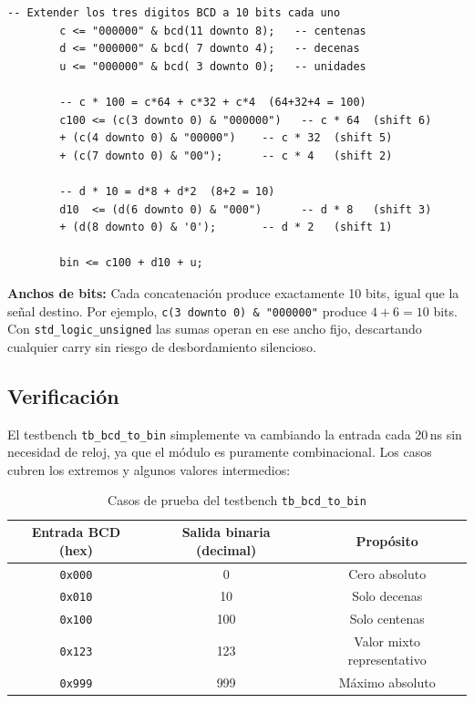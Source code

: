 \documentclass[memoria_final]{subfiles}
\begin{document}
	\begin{lstlisting}[caption={Núcleo de \texttt{bcd\_to\_bin.vhd} --- multiplicación por desplazamientos}]
		-- Extender los tres digitos BCD a 10 bits cada uno
		c <= "000000" & bcd(11 downto 8);   -- centenas
		d <= "000000" & bcd( 7 downto 4);   -- decenas
		u <= "000000" & bcd( 3 downto 0);   -- unidades
		
		-- c * 100 = c*64 + c*32 + c*4  (64+32+4 = 100)
		c100 <= (c(3 downto 0) & "000000")   -- c * 64  (shift 6)
		+ (c(4 downto 0) & "00000")    -- c * 32  (shift 5)
		+ (c(7 downto 0) & "00");      -- c * 4   (shift 2)
		
		-- d * 10 = d*8 + d*2  (8+2 = 10)
		d10  <= (d(6 downto 0) & "000")      -- d * 8   (shift 3)
		+ (d(8 downto 0) & '0');       -- d * 2   (shift 1)
		
		bin <= c100 + d10 + u;
	\end{lstlisting}
	
	\begin{tcolorbox}[colback=SoftOrange, colframe=MainOrange, boxrule=0.8pt, arc=2pt,
		left=0.5cm, right=0.5cm, top=0.3cm, bottom=0.3cm]
		\small\faExclamationTriangle\enspace\textbf{Anchos de bits:} Cada
		concatenación produce exactamente 10 bits, igual que la señal destino.
		Por ejemplo, \texttt{c(3 downto 0) \& "000000"} produce
		$4 + 6 = 10$ bits. Con \texttt{std\_logic\_unsigned} las sumas operan
		en ese ancho fijo, descartando cualquier carry sin riesgo de
		desbordamiento silencioso.
	\end{tcolorbox}
	
	\subsection{Verificación}
	
	El testbench \texttt{tb\_bcd\_to\_bin} simplemente va cambiando la entrada cada 20\,ns sin necesidad de reloj, ya que el módulo es puramente combinacional. Los casos cubren los extremos y algunos valores intermedios:
	
	\begin{table}[H]
		\centering
		\caption{Casos de prueba del testbench \texttt{tb\_bcd\_to\_bin}}
		\begin{tabular}{ccc}
			\toprule
			\textbf{Entrada BCD (hex)} & \textbf{Salida binaria (decimal)} & \textbf{Propósito} \\
			\midrule
			\texttt{0x000} & 0   & Cero absoluto \\
			\texttt{0x010} & 10  & Solo decenas  \\
			\texttt{0x100} & 100 & Solo centenas \\
			\texttt{0x123} & 123 & Valor mixto representativo \\
			\texttt{0x999} & 999 & Máximo absoluto \\
			\bottomrule
		\end{tabular}
		\label{tab:tb-bcd2bin}
	\end{table}
	
\end{document}
